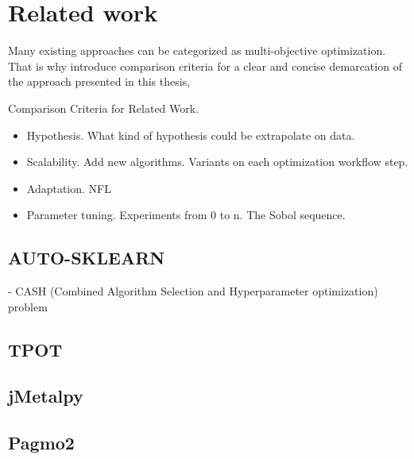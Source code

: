 \chapter{Related work}
    Many existing approaches can be categorized as multi-objective optimization. That is why
    introduce comparison criteria for a clear and concise demarcation of the approach presented in this thesis, 

    Comparison Criteria for Related Work. 
    \begin{itemize}
        \item Hypothesis. What kind of hypothesis could be extrapolate on data.
        \item Scalability. Add new algorithms. Variants on each optimization workflow step.
        \item Adaptation. NFL
        \item Parameter tuning. Experiments from 0 to n. The Sobol sequence.                
    \end{itemize}

    \section{AUTO-SKLEARN} \cite{autosklearn:feurer2015efficient}
    - CASH (Combined Algorithm Selection and Hyperparameter optimization) problem

    \section{TPOT} \cite{OlsonGECCO2016}

    \section{jMetalpy} \cite{benitezhidalgo2019jmetalpy}

    \section{Pagmo2} \cite{francesco_biscani_2019_3582877}